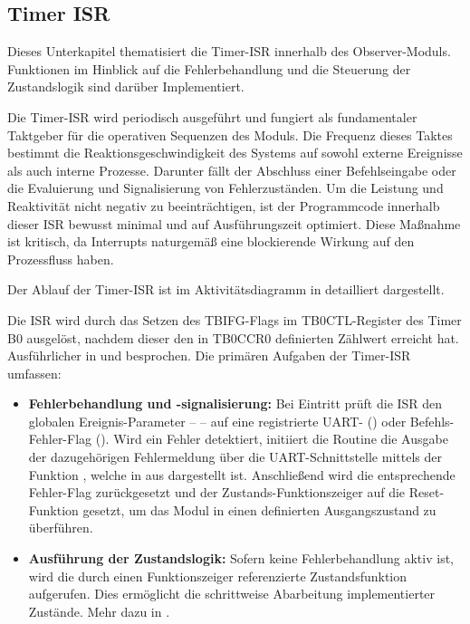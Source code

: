 
\newpage
\subsection{Timer ISR}
\label{sec:Timer_ISR}

Dieses Unterkapitel thematisiert die Timer-ISR innerhalb des Observer-Moduls. Funktionen im Hinblick auf die Fehlerbehandlung und die Steuerung der Zustandslogik sind dar\"uber Implementiert.

Die Timer-ISR wird periodisch ausgef\"uhrt und fungiert als fundamentaler Taktgeber f\"ur die operativen Sequenzen des Moduls. Die Frequenz dieses Taktes bestimmt die Reaktionsgeschwindigkeit des Systems auf sowohl externe Ereignisse als auch interne Prozesse. Darunter f\"allt der Abschluss einer Befehlseingabe oder die Evaluierung und Signalisierung von Fehlerzust\"anden. Um die Leistung und Reaktivit\"at nicht negativ zu beeintr\"achtigen, ist der Programmcode innerhalb dieser ISR bewusst minimal und auf Ausf\"uhrungszeit optimiert. Diese Ma{\ss}nahme ist kritisch, da Interrupts naturgem\"a{\ss} eine blockierende Wirkung auf den Prozessfluss haben.

Der Ablauf der Timer-ISR ist im Aktivit\"atsdiagramm in  detailliert dargestellt. 

Die ISR wird durch das Setzen des TBIFG-Flags im TB0CTL-Register des Timer B0 ausgel\"ost, nachdem dieser den in TB0CCR0 definierten Z\"ahlwert erreicht hat. Ausf\"uhrlicher in  und  besprochen. Die prim\"aren Aufgaben der Timer-ISR umfassen:

\begin{itemize}
	\item \textbf{Fehlerbehandlung und -signalisierung:} Bei Eintritt pr\"uft die ISR den globalen Ereignis-Parameter --  -- auf eine registrierte UART- () oder Befehls-Fehler-Flag (). Wird ein Fehler detektiert, initiiert die Routine die Ausgabe der dazugeh\"origen Fehlermeldung \"uber die UART-Schnittstelle mittels der Funktion , welche in  aus  dargestellt ist. Anschlie{\ss}end wird die entsprechende Fehler-Flag zur\"uckgesetzt und der Zustands-Funktionszeiger  auf die Reset-Funktion  gesetzt, um das Modul in einen definierten Ausgangszustand zu \"uberf\"uhren.

	\item \textbf{Ausf\"uhrung der Zustandslogik:} Sofern keine Fehlerbehandlung aktiv ist, wird die durch einen Funktionszeiger referenzierte Zustandsfunktion aufgerufen. Dies erm\"oglicht die schrittweise Abarbeitung implementierter Zust\"ande. Mehr dazu in .
\end{itemize}

